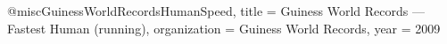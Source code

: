 @misc{GuinessWorldRecordsHumanSpeed,
    title = {Guiness World Records --- Fastest Human (running)},
    organization = {Guiness World Records},
    year = {2009}
}
